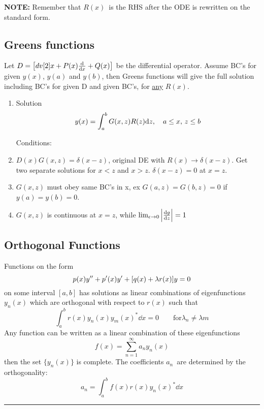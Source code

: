\documentclass[10pt,a4paper]{article}
\newcommand{\Holine}[1][\medskipamount]{\par\vspace*{\dimexpr-\parskip-\baselineskip+#1}\noindent\rule{\linewidth}{3pt}\par\vspace*{\dimexpr-\parskip-.5\baselineskip+#1}}
\begin{document}
\begin{multicols}{2}
\textbf{NOTE:} Remember that $R(x)$ is the RHS after the ODE is rewritten on the standard form.



\subsection*{Greens functions}
Let $D = \qty[ dv[2]{x} + P(x)\dv{x} + Q(x)]$ be the differential operator. Assume BC's for given $y(x)$, $y(a)$ and $y(b)$, then Greens functions will give the full solution including BC's for given D and given BC's, for \underline{any} $R(x)$.
\begin{enumerate}
\item Solution \[y(x) = \int_a^b G(x,z)R(z) \dd z \qc a \leq x, \, z \leq b\]

Conditions:
\item $D(x)G(x,z) = \delta(x-z)$, original DE with $R(x) \rightarrow \delta(x-z)$. Get two separate solutions for $x<z$ and $x>z$. $\delta(x-z) =0$ at $x=z$.
\item $G(x,z)$ must obey same BC's in x, ex ${G(a,z)=G(b,z)=0}$ if $y(a)=y(b)=0$.
\item $G(x,z)$ is continuous at $x=z$, while $\lim_{\epsilon\rightarrow0}\abs{\dv{g}{z}} = 1$ 
\end{enumerate}


\subsection*{Orthogonal Functions}
Functions on the form
\[
    p(x)y'' + p'(x)y' + \qty[q(x) + \lambda r(x)]y = 0
\]
on some interval $[a,b]$ has solutions as linear combinations of eigenfunctions $y_n(x)$ which are orthogonal with respect to $r(x)$ such that
\[
    \int_a^b r(x)y_n(x)y_m(x)^* \dd{x} = 0 \quad\quad \text{for} \lambda_n \neq \lambda{m}
\]
Any function can be written as a linear combination of these eigenfunctions
\[
    f(x) = \sum_{n=1}^\infty a_n y_n(x)
\]
then the set $\{y_n(x)\}$ is complete. The coefficients $a_n$ are determined by the orthogonality:
\[
    a_n = \int_a^b f(x)r(x)y_n(x)^* \dd{x}
\]









\Holine

\end{multicols}
\end{document}
